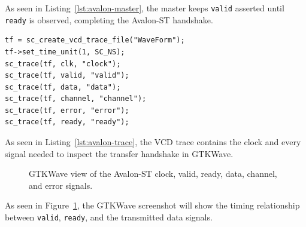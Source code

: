 \documentclass[12pt]{article}
\begin{document}
As seen in Listing~\ref{lst:avalon-master}, the master keeps \texttt{valid} asserted until \texttt{ready} is observed, completing the Avalon-ST handshake.

\begin{lstlisting}[caption={VCD trace configuration for the Avalon-ST interface signals.}, label={lst:avalon-trace}]
tf = sc_create_vcd_trace_file("WaveForm");
tf->set_time_unit(1, SC_NS);
sc_trace(tf, clk, "clock");
sc_trace(tf, valid, "valid");
sc_trace(tf, data, "data");
sc_trace(tf, channel, "channel");
sc_trace(tf, error, "error");
sc_trace(tf, ready, "ready");
\end{lstlisting}

As seen in Listing~\ref{lst:avalon-trace}, the VCD trace contains the clock and every signal needed to inspect the transfer handshake in GTKWave.

\begin{figure}[htbp]
    \centering
    \caption{GTKWave view of the Avalon-ST clock, valid, ready, data, channel, and error signals.}
    \label{fig:avalon-result}
\end{figure}

As seen in Figure~\ref{fig:avalon-result}, the GTKWave screenshot will show the timing relationship between \texttt{valid}, \texttt{ready}, and the transmitted data signals.
\end{document}
